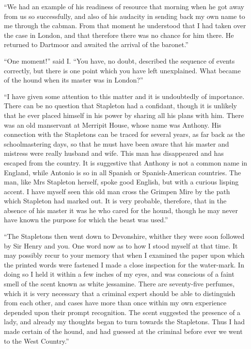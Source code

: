 \documentclass[paper=5.5in:8.5in,BCOR=7mm,twoside,DIV=calc,12pt,usegeometry,openany,chapterprefix,endperiod,headings=big]{scrbook} %
\begin{document}
\enquote{We had an example of his readiness of resource that morning when he got away from us so successfully, and also of his audacity in sending back my own name to me through the cabman. From that moment he understood that I had taken over the case in London, and that therefore there was no chance for him there. He returned to Dartmoor and awaited the arrival of the baronet.}

\enquote{One moment!} said I. \enquote{You have, no doubt, described the sequence of events correctly, but there is one point which you have left unexplained. What became of the hound when its master was in London?}

\enquote{I have given some attention to this matter and it is undoubtedly of importance. There can be no question that Stapleton had a confidant, though it is unlikely that he ever placed himself in his power by sharing all his plans with him. There was an old manservant at Merripit House, whose name was Anthony. His connection with the Stapletons can be traced for several years, as far back as the schoolmastering days, so that he must have been aware that his master and mistress were really husband and wife. This man has disappeared and has escaped from the country. It is suggestive that Anthony is not a common name in England, while Antonio is so in all Spanish or Spanish-American countries. The man, like Mrs Stapleton herself, spoke good English, but with a curious lisping accent. I have myself seen this old man cross the Grimpen Mire by the path which Stapleton had marked out. It is very probable, therefore, that in the absence of his master it was he who cared for the hound, though he may never have known the purpose for which the beast was used.}

\enquote{The Stapletons then went down to Devonshire, whither they were soon followed by Sir Henry and you. One word now as to how I stood myself at that time. It may possibly recur to your memory that when I examined the paper upon which the printed words were fastened I made a close inspection for the water-mark. In doing so I held it within a few inches of my eyes, and was conscious of a faint smell of the scent known as white jessamine. There are seventy-five perfumes, which it is very necessary that a criminal expert should be able to distinguish from each other, and cases have more than once within my own experience depended upon their prompt recognition. The scent suggested the presence of a lady, and already my thoughts began to turn towards the Stapletons. Thus I had made certain of the hound, and had guessed at the criminal before ever we went to the West Country.}
\end{document}
